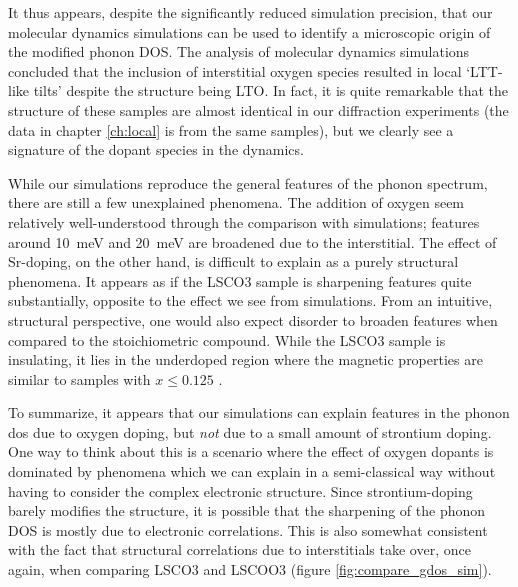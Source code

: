 It thus appears, despite the significantly reduced simulation precision, that our molecular dynamics simulations can be used to identify a microscopic origin of the modified phonon DOS. The analysis of molecular dynamics simulations concluded that the inclusion of interstitial oxygen species resulted in local `LTT-like tilts' despite the structure being LTO. In fact, it is quite remarkable that the structure of these samples are almost identical in our diffraction experiments (the data in chapter \ref{ch:local} is from the same samples), but we clearly see a signature of the dopant species in the dynamics. 

While our simulations reproduce the general features of the phonon spectrum, there are still a few unexplained phenomena. The addition of oxygen seem relatively well-understood through the comparison with simulations; features around \SI{10}{\milli\eV} and \SI{20}{\milli\eV} are broadened due to the interstitial. The effect of Sr-doping, on the other hand, is difficult to explain as a purely structural phenomena. It appears as if the LSCO3 sample is sharpening features quite substantially, opposite to the effect we see from simulations. From an intuitive, structural perspective, one would also expect disorder to broaden features when compared to the stoichiometric compound. While the LSCO3 sample is insulating, it lies in the underdoped region where the magnetic properties are similar to samples with $x \leq 0.125$ \cite{Julien2003}. 

To summarize, it appears that our simulations can explain features in the phonon dos due to oxygen doping, but \emph{not} due to a small amount of strontium doping. One way to think about this is a scenario where the effect of oxygen dopants is dominated by phenomena which we can explain in a semi-classical way without having to consider the complex electronic structure. Since strontium-doping barely modifies the structure, it is possible that the sharpening of the phonon DOS is mostly due to electronic correlations. This is also somewhat consistent with the fact that structural correlations due to interstitials take over, once again, when comparing LSCO3 and LSCOO3 (figure \ref{fig:compare_gdos_sim}).

